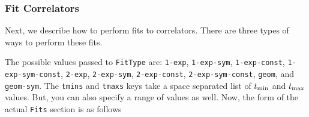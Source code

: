 \documentclass[12pt,letterpaper,notitlepage]{article}
\newcommand{\key}[1]{\textcolor{Emerald}{\texttt{\small{#1}}}}
\begin{document}
\subsubsection{Fit Correlators}
\label{subsubsec:corr_fit}

Next, we describe how to perform fits to correlators.
There are three types of ways to perform these fits. 

The possible values passed to \key{FitType} are:
\texttt{1-exp}, \texttt{1-exp-sym}, \texttt{1-exp-const}, \texttt{1-exp-sym-const}, \texttt{2-exp}, \texttt{2-exp-sym}, \texttt{2-exp-const},
\texttt{2-exp-sym-const}, \texttt{geom}, and \texttt{geom-sym}.
The \key{tmins} and \key{tmaxs} keys take a space separated list of $t_{\rm min}$ and $t_{\rm max}$ values.
But, you can also specify a range of values as well.
Now, the form of the actual \key{Fits} section is as follows
\end{document}
